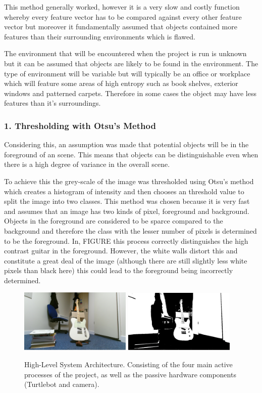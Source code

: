\documentclass{mproj}
\begin{document}
This method generally worked, however it is a very slow and costly function whereby every feature vector has to be compared against every other feature vector but moreover it fundamentally assumed that objects contained more features than their surrounding environments which is flawed. 

The environment that will be encountered when the project is run is unknown but it can be assumed that objects are likely to be found in the environment. The type of environment will be variable but will typically be an office or workplace which will feature some areas of high entropy such as book shelves, exterior windows and patterned carpets. Therefore in some cases the object may have less features than it's surroundings.

\subsubsection{1. Thresholding with Otsu's Method}

Considering this, an assumption was made that potential objects will be in the foreground of an scene. This means that objects can be distinguishable even when there is a high degree of variance in the overall scene. 

To achieve this the grey-scale of the image was thresholded using Otsu's method which creates a histogram of intensity and then chooses an  threshold value to split the image into two classes. This method was chosen because it is very fast and assumes that an image has two kinds of pixel, foreground and background\cite{otsu}. Objects in the foreground are considered to be sparce compared to the background and therefore the class with the lesser number of pixels is determined to be the foreground. In, FIGURE this process correctly distinguishes the high contrast guitar in the foreground. However, the white walls distort this and constitute a great deal of the image (although there are still slightly less white pixels than black here) this could lead to the foreground being incorrectly determined.

\begin{figure}
   \caption{High-Level System Architecture. Consisting of the four main active processes of the project, as well as the passive hardware components (Turtlebot and camera).}
   \centering
   \includegraphics[width=0.475\textwidth]{images/basic.png}
   \hfill
   \includegraphics[width=0.475\textwidth]{images/otsu.png}
\end{figure}
\end{document}
